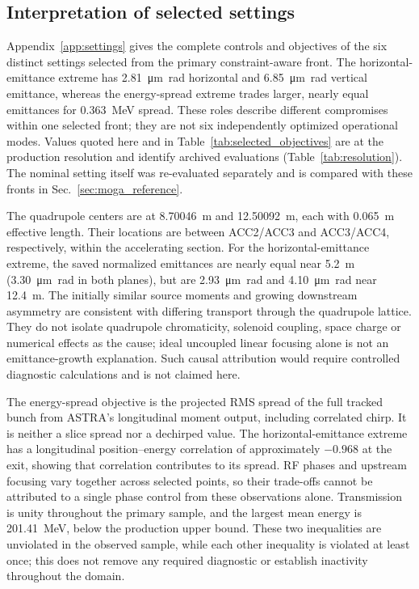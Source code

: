 \documentclass[aps,prab,reprint,superscriptaddress,amsmath,amssymb,floatfix]{revtex4-2}
\begin{document}
\subsection{Interpretation of selected settings}
\label{sec:settings}
Appendix~\ref{app:settings} gives the complete controls and objectives of the six distinct
settings selected from the primary constraint-aware front. The horizontal-emittance extreme
has \SI{2.81}{\micro\metre\radian} horizontal and \SI{6.85}{\micro\metre\radian}
vertical emittance, whereas the energy-spread extreme trades larger, nearly equal emittances
for \SI{0.363}{\mega\electronvolt} spread. These roles describe different compromises
within one selected front; they are not six independently optimized operational modes.
Values quoted here and in Table~\ref{tab:selected_objectives} are at the production
resolution and identify archived evaluations (Table~\ref{tab:resolution}). The
nominal setting itself was re-evaluated separately and is compared with these fronts in
Sec.~\ref{sec:moga_reference}.

The quadrupole centers are at \SI{8.70046}{\metre} and \SI{12.50092}{\metre}, each with
\SI{0.065}{\metre} effective length. Their locations are between ACC2/ACC3 and ACC3/ACC4,
respectively, within the accelerating section. For the horizontal-emittance extreme, the saved
normalized emittances are nearly equal near \SI{5.2}{\metre} (\SI{3.30}{\micro\metre\radian} in
both planes), but are \SI{2.93}{\micro\metre\radian} and \SI{4.10}{\micro\metre\radian} near
\SI{12.4}{\metre}. The initially similar source moments and growing downstream asymmetry are
consistent with differing transport through the quadrupole lattice. They do not isolate
quadrupole chromaticity, solenoid coupling, space charge or numerical effects as the cause;
ideal uncoupled linear focusing alone is not an emittance-growth explanation. Such causal
attribution would require controlled diagnostic calculations and is not claimed here.

The energy-spread objective is the projected RMS spread of the full tracked bunch from ASTRA's
longitudinal moment output, including correlated chirp. It is neither a slice spread nor a
dechirped value. The horizontal-emittance extreme has a longitudinal position--energy
correlation of approximately $-0.968$ at the exit, showing that correlation contributes to its
spread. RF phases and upstream focusing vary together across selected points, so their
trade-offs cannot be attributed to a single phase control from these observations alone.
Transmission is unity throughout the primary sample, and the largest mean energy is
\SI{201.41}{\mega\electronvolt}, below the production upper bound. These two inequalities are
unviolated in the observed sample, while each other inequality is violated at least once; this
does not remove any required diagnostic or establish inactivity throughout the domain.
\end{document}
